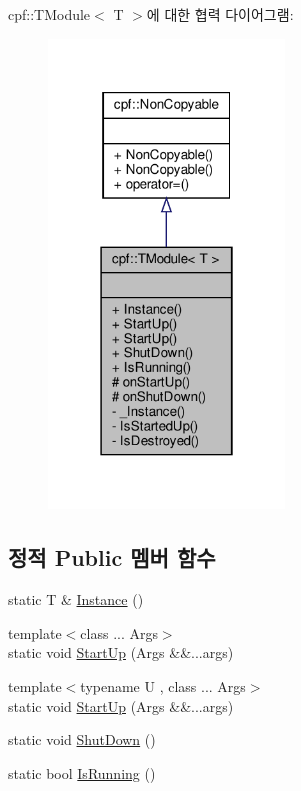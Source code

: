 cpf\+:\+:T\+Module$<$ T $>$에 대한 협력 다이어그램\+:\nopagebreak
\begin{figure}[H]
\begin{center}
\leavevmode
\includegraphics[width=178pt]{classcpf_1_1_t_module__coll__graph}
\end{center}
\end{figure}
\subsection*{정적 Public 멤버 함수}
\begin{DoxyCompactItemize}
\item 
static T \& \hyperlink{classcpf_1_1_t_module_ac8065254584cb0a6656c42f96859d190}{Instance} ()
\item 
{\footnotesize template$<$class ... Args$>$ }\\static void \hyperlink{classcpf_1_1_t_module_a02fbf3c4d28a3328e81b0e8d0bdd93b0}{Start\+Up} (Args \&\&...args)
\item 
{\footnotesize template$<$typename U , class ... Args$>$ }\\static void \hyperlink{classcpf_1_1_t_module_ac553266ad6255da045ef3f34b0f9bc16}{Start\+Up} (Args \&\&...args)
\item 
static void \hyperlink{classcpf_1_1_t_module_a61452801c61e2546b75a7a6a545e82ee}{Shut\+Down} ()
\item 
static bool \hyperlink{classcpf_1_1_t_module_acd38943803d522ba6dcf7f0871b2f502}{Is\+Running} ()
\end{DoxyCompactItemize}
